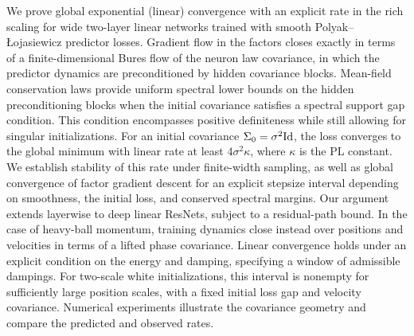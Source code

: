 We prove global exponential (linear) convergence with an explicit rate in the rich scaling for wide two-layer linear networks trained with smooth
Polyak--\L{}ojasiewicz predictor losses. Gradient flow in the factors closes exactly in terms of a finite-dimensional Bures flow of the neuron law covariance, in which the predictor dynamics are preconditioned by hidden covariance blocks.
Mean-field conservation laws provide uniform spectral lower bounds on the hidden preconditioning blocks when the initial covariance satisfies a spectral support gap condition.
This condition encompasses positive definiteness while still allowing for singular initializations.
For an initial covariance $\Sigma_0 = \sigma^2 \mathrm{Id}$, the loss converges to the global minimum with linear rate at least $4\sigma^2\kappa$, where $\kappa$ is the PL constant. We establish stability of this rate under finite-width sampling, as well as global convergence of factor gradient descent for an explicit stepsize interval depending on smoothness, the initial loss, and conserved spectral margins.
Our argument extends layerwise to deep linear ResNets, subject to a residual-path bound.
In the case of heavy-ball momentum, training dynamics close instead over positions and velocities in terms of a lifted phase covariance.
Linear convergence holds under an explicit condition on the energy and damping, specifying a window of admissible dampings. For two-scale white initializations, this interval is nonempty for sufficiently large position scales, with a fixed initial loss gap and velocity covariance. Numerical experiments illustrate the covariance geometry and compare the predicted and observed rates.

